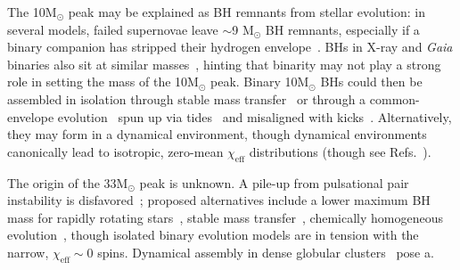 \documentclass[%
    aps,
    prl,
    reprint,
    superscriptaddress,
    nolongbibliography,
    nobibnotes,
    nofootinbib,
    linenumbers,
    amsmath,amssymb,
]{revtex4-2}
\newcommand{\Msun}{\ensuremath{\mathrm{M}_{\odot}}}
\newcommand{\chieff}{\ensuremath{\chi_{\mathrm{eff}}}}
\newcommand{\gaussianspins}{\textsc{Gaussian}\xspace}
\newcommand{\featTen}{10\xspace}
\newcommand{\featThirtyFive}{33\xspace}
\begin{document}

The \featTen $\Msun$ peak may be explained as \ac{BH} remnants from stellar evolution: in several models, failed supernovae leave $\sim$9 $\Msun$ \ac{BH} remnants, especially if a binary companion has stripped their hydrogen envelope~\cite{Sukhbold:2015wba, Woosley:2019nnp, Schneider:2023mxe, Laplace:2024kba, Legred:2026oiz}. \acp{BH} in X-ray and \textit{Gaia} binaries also sit at similar masses~\cite{Ozel:2010su, El-Badry:2023pah}, hinting that binarity may not play a strong role in setting the mass of the \featTen $\Msun$ peak. Binary \featTen $\Msun$ \acp{BH} could then be assembled in isolation through stable mass transfer~\cite{vanSon:2022myr} or through a common-envelope evolution~\cite{Belczynski:2016obo, Stevenson:2017tfq} spun up via tides~\cite{Kushnir:2016zee, Zaldarriaga:2017qkw, Hotokezaka:2017esv, Qin:2018vaa, Bavera:2020inc, Bavera:2020uch} and misaligned with kicks~\cite{Kalogera:1999tq, Gerosa:2018wbw, Steinle:2020xej, Tauris:2022ggv, Baibhav:2024rkn, Dossena:2026cwf}. Alternatively, they may form in a dynamical environment, though dynamical environments canonically lead to isotropic, zero-mean $\chieff$ distributions \cite{Mandel:2009nx, Rodriguez:2016vmx, Vitale:2015tea, Farr:2017uvj, Stevenson:2017dlk, Talbot:2017yur} (though see Refs.~\cite{Corsaro:2017spin, Trani:2021lcv, Banerjee:2023ycw, Healy:2023spin, Kiroglu:2025bbp, Dossena:2026cwf}). 

The origin of the \featThirtyFive $\Msun$ peak is unknown. A pile-up from pulsational pair instability is disfavored~\cite{Hendriks:2023yrw, Golomb:2023vxm, Roy:2025ktr}; proposed alternatives include a lower maximum \ac{BH} mass for rapidly rotating stars~\cite{Winch:2025wim, Vink:2025uoo}, stable mass transfer~\cite{Briel:2022cfl}, chemically homogeneous evolution~\cite{Mandel:2015qlu, Marchant:2016wow}, though isolated binary evolution models are in tension with the narrow, $\chieff\sim 0$ spins.  Dynamical assembly in dense globular clusters~\cite{Antonini:2022vib, Sridhar:2025kvi} pose a.
\end{document}

